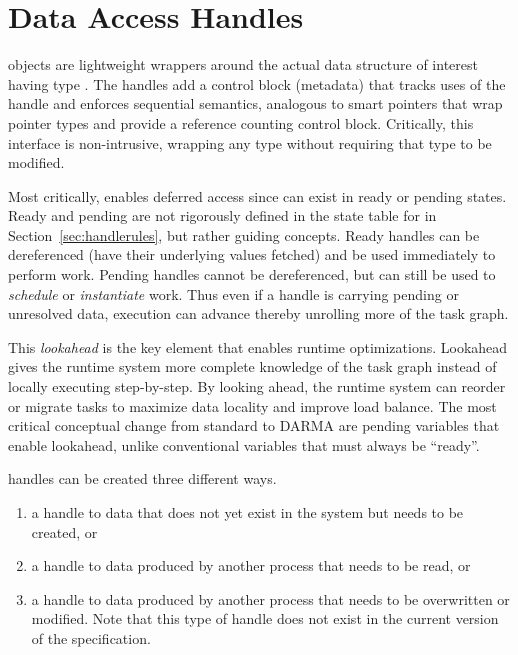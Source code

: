 

\section{Data Access Handles}
\label{sec:handles}
 objects are lightweight wrappers around the actual
data structure of interest having type . 
The \glspl{handle} add a control block (metadata) that tracks uses of the \gls{handle} and enforces
\gls{sequential semantics}, analogous to smart pointers that wrap pointer types and provide a reference counting control block.
Critically, this interface is non-intrusive, wrapping any type  without requiring that type to be modified.

Most critically, \ahandle enables deferred access since \ahandle can exist in ready or pending states. 
Ready and pending are not rigorously defined in the state table for \ahandle in
Section~\ref{sec:handlerules}, but rather guiding concepts.
Ready \glspl{handle} can be dereferenced (have their underlying values
\gls{fetch}ed) and be used immediately to perform work.
Pending \glspl{handle} cannot be dereferenced, but can still be used to \emph{schedule} or \emph{instantiate} work.
Thus even if a \gls{handle} is carrying pending or unresolved data, execution can advance thereby unrolling more of the task graph.

This \emph{lookahead} is the key element that enables runtime optimizations.
Lookahead gives the \gls{runtime system} more complete knowledge of the task graph instead of locally executing step-by-step.
By looking ahead, the \gls{runtime system} can reorder or migrate \glspl{task} to maximize data locality and improve load balance.
The most critical conceptual change from standard \CC{} to \gls{DARMA} are
pending variables that enable lookahead, unlike conventional \CC{} variables that must always be ``ready''.

\Glspl{handle} can be created three different ways.
\begin{enumerate}
  \item a \gls{handle} to data that does not yet exist in the system
but needs to be created, or
\item a \gls{handle} to data produced by another process that needs to
be read, or 
\item a \gls{handle} to data produced by another process that needs to be overwritten or modified. 
  Note that this type of \gls{handle} does not exist in the current version of
  the specification.
\end{enumerate}

